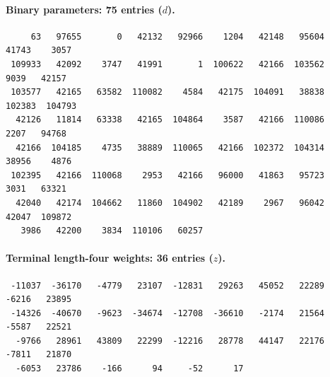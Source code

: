\paragraph{Binary parameters: 75 entries ($d$).}
{\footnotesize
\begin{verbatim}
     63   97655       0   42132   92966    1204   42148   95604   41743    3057
 109933   42092    3747   41991       1  100622   42166  103562    9039   42157
 103577   42165   63582  110082    4584   42175  104091   38838  102383  104793
  42126   11814   63338   42165  104864    3587   42166  110086    2207   94768
  42166  104185    4735   38889  110065   42166  102372  104314   38956    4876
 102395   42166  110068    2953   42166   96000   41863   95723    3031   63321
  42040   42174  104662   11860  104902   42189    2967   96042   42047  109872
   3986   42200    3834  110106   60257
\end{verbatim}
}

\paragraph{Terminal length-four weights: 36 entries ($z$).}
{\footnotesize
\begin{verbatim}
 -11037  -36170   -4779   23107  -12831   29263   45052   22289   -6216   23895
 -14326  -40670   -9623  -34674  -12708  -36610   -2174   21564   -5587   22521
  -9766   28961   43809   22299  -12216   28778   44147   22176   -7811   21870
  -6053   23786    -166      94     -52      17
\end{verbatim}
}
